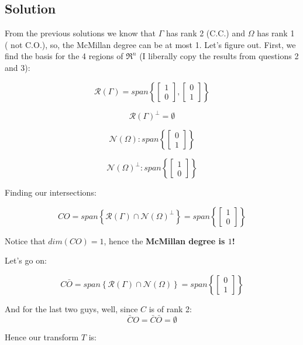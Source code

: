 \documentclass[10pt,a4paper]{article}
\begin{document}
\subsection*{Solution}
From the previous solutions we know that $\Gamma$ has rank 2 (C.C.) and $\Omega$ has rank 1 ( not C.O.), so, the McMillan degree can be at most 1. Let's figure out. First, we find the basis for the 4 regions of $\Re^{n} $ (I liberally copy the results from questions 2 and 3):

\[ \mathcal{R}(\Gamma) =  
span \left \{
\begin{bmatrix}
1 \\ 
0
\end{bmatrix},
\begin{bmatrix}
0 \\ 
1
\end{bmatrix}
\right \}
\]

\[ \mathcal{R}(\Gamma)^{\perp} =  
\emptyset
\]

\[
\mathcal{N}(\Omega) : 
span \left \{ 
\begin{bmatrix}
0 \\
1
\end{bmatrix}
\right \}
\]

\[
\mathcal{N}(\Omega)^{\perp} : 
span \left \{ 
\begin{bmatrix}
1 \\
0
\end{bmatrix}
\right \}
\]

Finding our intersections:

\[
CO = span 
\left \{
\mathcal{R}(\Gamma) \cap \mathcal{N}(\Omega)^{\perp} \right \}
=
span 
\left \{ 
\begin{bmatrix}
1 \\ 
0
\end{bmatrix} 
\right \} 
\]

Notice that $dim(CO) = 1$, hence the \textbf{McMillan degree is $1$!}
\medskip

Let's go on:

\[
C\bar{O} = 
span \left \{
\mathcal{R}(\Gamma) \cap \mathcal{N}(\Omega)
\right \}
= 
span
\left \{
\begin{bmatrix}
0 \\ 
1
\end{bmatrix}  
\right \}
\]

And for the last two guys, well, since $C$ is of rank 2:
\[
\bar{C}O = \bar{C}\bar{O} = \emptyset 
\]

Hence our transform $T$ is:
\end{document}

